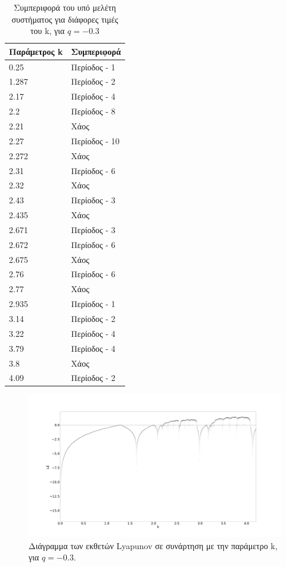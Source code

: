 \begin{table}[ht]
	\centering
	\caption{ Συμπεριφορά του υπό μελέτη συστήματος για διάφορες τιμές του k, για $q=-0.3$ }
	\label{tab:abc10}
	\begin{tabular}{l | l}
		Παράμετρος k & Συμπεριφορά \\
		\hline
		0.25 &  Περίοδος -  1 \\
		1.287 &  Περίοδος -  2 \\
		2.17& Περίοδος -  4 \\
		2.2& Περίοδος -  8 \\
		2.21 & Xάος \\
		2.27& Περίοδος - 10 \\
		2.272& Χάος \\
		2.31& Περίοδος - 6 \\
		2.32 &  Χάος \\
		2.43 &  Περίοδος -  3 \\
		2.435 &  Χάος \\
		2.671 &  Περίοδος -  3\\
		2.672 & Περίοδος - 6\\
		2.675 & Χάος\\
		2.76 &Περίοδος - 6 \\
		2.77& Χάος\\
		2.935 & Περίοδος -  1\\
		3.14& Περίοδος - 2\\
		3.22 & Περίοδος -  4\\
		3.79 &Περίοδος - 4\\
		3.8 & Χάος\\
		4.09& Περίοδος - 2
		
	\end{tabular}
	
\end{table}


\begin{figure}[ht]
	\centering
	\includegraphics[width=1\linewidth]{LateX images/sine q=-0.3/g2}
	\caption{Διάγραμμα των εκθετών Lyapunov σε συνάρτηση με την παράμετρο k, για $q=-0.3$.}
	\label{f:g45}
\end{figure}



